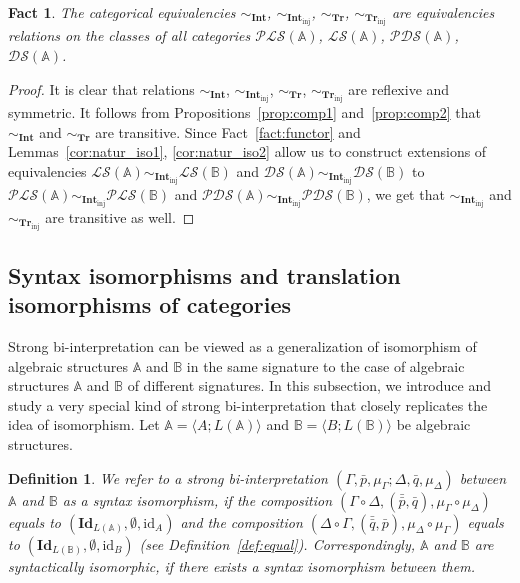 \documentclass[12pt]{article}
\newtheorem{fact}{Fact}
\newtheorem{definition}{Definition}
\theoremstyle{definition}
\def\MA{{\mathbb{A}}}
\def\MB{{\mathbb{B}}}
\def\Int{{\mathbf{Int}}}
\def\Tr{{\mathbf{Tr}}}
\newcommand{\Inj}{\mathrm{inj}}
\def\PLS{{\mathcal{PLS}}}
\def\PDS{{\mathcal{PDS}}}
\def\DS{{\mathcal{DS}}}
\def\LS{{\mathcal{LS}}}
\def\id{{\mathrm{id}}}
\def\Id{{\mathbf{Id}}}
\begin{document}
\begin{fact}\label{fact:eq_rel}
The categorical equivalencies $\sim_\Int$, $\sim_{\Int_\Inj}$, $\sim_\Tr$, $\sim_{\Tr_\Inj}$ are equivalencies relations on the classes of all categories $\PLS(\MA)$, $\LS(\MA)$, $\PDS(\MA)$, $\DS(\MA)$.
\end{fact}

\begin{proof}
It is clear that relations $\sim_\Int$, $\sim_{\Int_\Inj}$, $\sim_\Tr$, $\sim_{\Tr_\Inj}$ are reflexive and symmetric. It follows from Propositions~\ref{prop:comp1} and~\ref{prop:comp2} that $\sim_\Int$ and $\sim_\Tr$ are transitive. Since Fact~\ref{fact:functor} and Lemmas~\ref{cor:natur_iso1}, \ref{cor:natur_iso2} allow us to construct extensions of equivalencies $\LS(\MA)\sim_{\Int_\Inj}\LS(\MB)$ and $\DS(\MA)\sim_{\Int_\Inj}\DS(\MB)$ to $\PLS(\MA)\sim_{\Int_\Inj}\PLS(\MB)$ and $\PDS(\MA)\sim_{\Int_\Inj}\PDS(\MB)$, we get that $\sim_{\Int_\Inj}$ and  $\sim_{\Tr_\Inj}$ are transitive as well.
\end{proof}

\subsection{Syntax isomorphisms and translation isomorphisms of categories}\label{subsec:syn}

Strong bi-interpretation can be viewed as a generalization of isomorphism of algebraic structures $\MA$ and $\MB$ in the same signature to the case of algebraic structures $\MA$ and $\MB$ of different signatures. In this subsection, we introduce and study a very special kind of strong bi-interpretation that closely replicates the idea of isomorphism. Let $\MA=\langle A; L(\MA)\rangle$ and $\MB=\langle B; L(\MB)\rangle$ be algebraic structures.

\begin{definition}
    We refer to a strong bi-interpretation $(\Gamma,\bar p,\mu_\Gamma;\Delta,\bar q,\mu_\Delta)$ between $\MA$ and $\MB$ as a {\em syntax isomorphism}, if 
   the composition $(\Gamma\circ\Delta,(\bar{\bar p},\bar q),\mu_\Gamma\circ\mu_\Delta)$ equals to $(\Id_{L(\MA)},\emptyset,\id_A)$ and the composition $(\Delta\circ\Gamma,(\bar{\bar q},\bar p),\mu_\Delta\circ\mu_\Gamma)$ equals to $(\Id_{L(\MB)},\emptyset,\id_B)$ (see Definition~\ref{def:equal}).
    Correspondingly, $\MA$ and $\MB$ are {\em syntactically isomorphic}, if there exists a syntax isomorphism between them. 
\end{definition}
\end{document}
